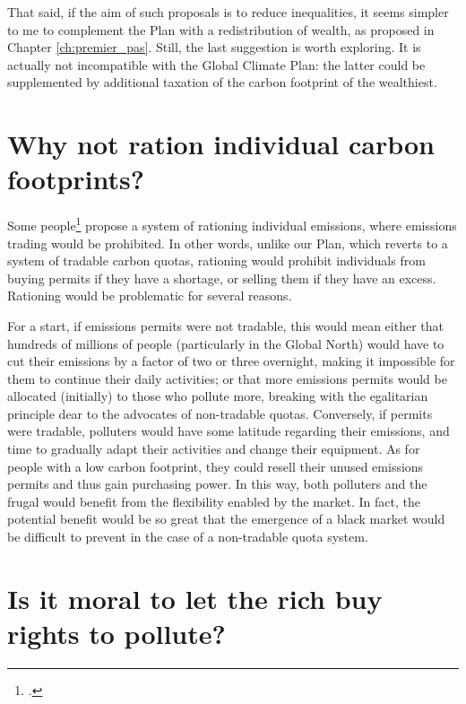 \documentclass[a5paper,english,openany]{memoir}
\begin{document}
That said, if the aim of such proposals is to reduce inequalities, it seems simpler to me to complement the Plan with a redistribution of wealth, as proposed in Chapter \ref{ch:premier_pas}. Still, the last suggestion is worth exploring. It is actually not incompatible with the Global Climate Plan: the latter could be supplemented by additional taxation of the carbon footprint of the wealthiest. 

\section*{\normalsize Why not ration individual carbon footprints?}\label{q:rationing}

Some people\footnote{\citet{wood_rationing_2023}.} propose a system of rationing individual emissions, where emissions trading would be prohibited. In other words, unlike our Plan, which reverts to a system of tradable carbon quotas, rationing would prohibit individuals from buying permits if they have a shortage, or selling them if they have an excess. %
Rationing would be problematic for several reasons. 

For a start, if emissions permits were not tradable, this would mean either that hundreds of millions of people (particularly in the Global North) would have to cut their emissions by a factor of two or three overnight, making it impossible for them to continue their daily activities; or that more emissions permits would be allocated (initially) to those who pollute more, breaking with the egalitarian principle dear to the advocates of non-tradable quotas. Conversely, if permits were tradable, polluters would have some latitude regarding their emissions, and time to gradually adapt their activities and change their equipment. As for people with a low carbon footprint, they could resell their unused emissions permits and thus gain purchasing power. In this way, both polluters and the frugal would benefit from the flexibility enabled by the market. In fact, the potential benefit would be so great that the emergence of a black market would be difficult to prevent in the case of a non-tradable quota system. 

\section*{\normalsize Is it moral to let the rich buy rights to pollute?}\label{q:moral}
\end{document}
